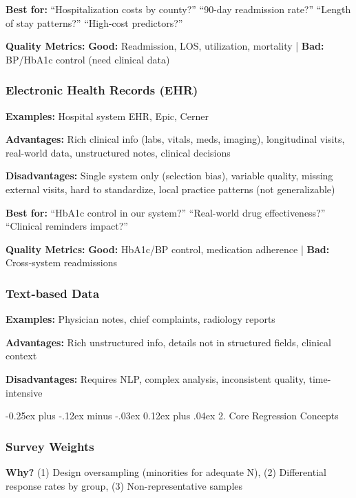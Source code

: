 ﻿\documentclass[8pt,letterpaper]{article}
\makeatletter
\renewcommand{\subsection}{\@startsection{subsection}{2}{0mm}%
                                {-0.25ex plus -.12ex minus -.03ex}%
                                {0.12ex plus .04ex}%
                                {\normalfont\fontsize{8pt}{8pt}\selectfont\bfseries\color{myblue}}}
\makeatother
\begin{document}
\begin{multicols}{2}
\textbf{Best for:} ``Hospitalization costs by county?'' ``90-day readmission rate?'' ``Length of stay patterns?'' ``High-cost predictors?''

\textbf{Quality Metrics:} \textbf{Good:} Readmission, LOS, utilization, mortality | \textbf{Bad:} BP/HbA1c control (need clinical data)

\subsubsection{Electronic Health Records (EHR)}

\textbf{Examples:} Hospital system EHR, Epic, Cerner

\textbf{Advantages:} Rich clinical info (labs, vitals, meds, imaging), longitudinal visits, real-world data, unstructured notes, clinical decisions

\textbf{Disadvantages:} Single system only (selection bias), variable quality, missing external visits, hard to standardize, local practice patterns (not generalizable)

\textbf{Best for:} ``HbA1c control in our system?'' ``Real-world drug effectiveness?'' ``Clinical reminders impact?''

\textbf{Quality Metrics:} \textbf{Good:} HbA1c/BP control, medication adherence | \textbf{Bad:} Cross-system readmissions

\subsubsection{Text-based Data}

\textbf{Examples:} Physician notes, chief complaints, radiology reports

\textbf{Advantages:} Rich unstructured info, details not in structured fields, clinical context

\textbf{Disadvantages:} Requires NLP, complex analysis, inconsistent quality, time-intensive

\subsection{2. Core Regression Concepts}

\subsubsection{Survey Weights}

\textbf{Why?} (1) Design oversampling (minorities for adequate N), (2) Differential response rates by group, (3) Non-representative samples


\end{multicols}
\end{document}
